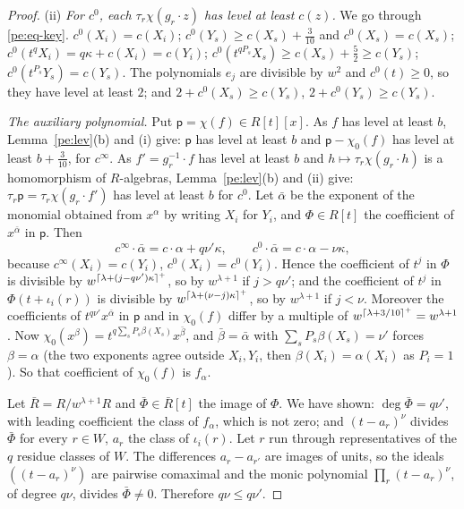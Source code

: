 \documentclass[10pt]{amsart}
\theoremstyle{definition}
\theoremstyle{remark}
\begin{document}
\begin{proof}
(ii) \emph{For $c^0$, each $\tau_r\chi(g_r\cdot z)$ has level at least $c(z)$.} We go through
\eqref{pe:eq-key}. $c^0(X_i)=c(X_i)$; $c^0(Y_s)\ge c(X_s)+\tfrac3{10}$ and $c^0(X_s)=c(X_s)$;
$c^0(t^qX_i)=q\kappa+c(X_i)=c(Y_i)$; $c^0(t^{qP_s}X_s)\ge c(X_s)+\tfrac52\ge c(Y_s)$;
$c^0(t^{P_s}Y_s)=c(Y_s)$. The polynomials $e_j$ are divisible by $w^2$ and $c^0(t)\ge0$, so they
have level at least $2$; and $2+c^0(X_s)\ge c(Y_s)$, $2+c^0(Y_s)\ge c(Y_s)$.

\emph{The auxiliary polynomial.} Put $\mathsf p=\chi(f)\in R[t][x]$. As $f$ has level at least
$b$, Lemma~\ref{pe:lev}(b) and (i) give: $\mathsf p$ has level at least $b$ and $\mathsf p-\chi_0(f)$
has level at least $b+\tfrac3{10}$, for $c^\infty$. As $f'=g_r^{-1}\cdot f$ has level at least $b$
and $h\mapsto\tau_r\chi(g_r\cdot h)$ is a homomorphism of $R$-algebras, Lemma~\ref{pe:lev}(b) and
(ii) give: $\tau_r\mathsf p=\tau_r\chi(g_r\cdot f')$ has level at least $b$ for $c^0$. Let
$\bar\alpha$ be the exponent of the monomial obtained from $x^\alpha$ by writing $X_i$ for $Y_i$,
and $\Phi\in R[t]$ the coefficient of $x^{\bar\alpha}$ in $\mathsf p$. Then
\[
c^\infty\cdot\bar\alpha=c\cdot\alpha+q\nu'\kappa,\qquad c^0\cdot\bar\alpha=c\cdot\alpha-\nu\kappa,
\]
because $c^\infty(X_i)=c(Y_i)$, $c^0(X_i)=c^0(Y_i)$. Hence the coefficient of $t^j$ in $\Phi$ is
divisible by $w^{\lceil \lambda+(j-q\nu')\kappa\rceil^{+}}$, so by $w^{\lambda+1}$ if $j>q\nu'$; and the
coefficient of $t^j$ in $\Phi(t+\iota_i(r))$ is divisible by $w^{\lceil \lambda+(\nu-j)\kappa\rceil^{+}}$,
so by $w^{\lambda+1}$ if $j<\nu$. Moreover the coefficients of $t^{q\nu'}x^{\bar\alpha}$ in
$\mathsf p$ and in $\chi_0(f)$ differ by a multiple of $w^{\lceil \lambda+3/10\rceil^{+}}=w^{\lambda+1}$.
Now $\chi_0(x^\beta)=t^{q\sum_sP_s\beta(X_s)}x^{\bar\beta}$, and $\bar\beta=\bar\alpha$ with
$\sum_sP_s\beta(X_s)=\nu'$ forces $\beta=\alpha$ (the two exponents agree outside $X_i,Y_i$, then
$\beta(X_i)=\alpha(X_i)$ as $P_i=1$). So that coefficient of $\chi_0(f)$ is $f_\alpha$.

Let $\bar R=R/w^{\lambda+1}R$ and $\bar\Phi\in\bar R[t]$ the image of $\Phi$. We have shown:
$\deg\bar\Phi=q\nu'$, with leading coefficient the class of $f_\alpha$, which is not zero; and
$(t-a_r)^\nu$ divides $\bar\Phi$ for every $r\in W$, $a_r$ the class of $\iota_i(r)$. Let $r$ run
through representatives of the $q$ residue classes of $W$. The differences $a_r-a_{r'}$ are images
of units, so the ideals $((t-a_r)^\nu)$ are pairwise comaximal and the monic polynomial
$\prod_r(t-a_r)^\nu$, of degree $q\nu$, divides $\bar\Phi\ne0$. Therefore $q\nu\le q\nu'$.
\end{proof}
\end{document}
